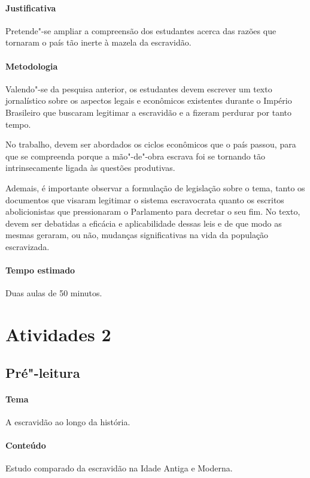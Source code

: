 \documentclass[12pt]{extarticle}
\begin{document}
\paragraph{Justificativa} Pretende"-se ampliar a compreensão dos estudantes acerca das razões que
tornaram o país tão inerte à mazela da escravidão.

\paragraph{Metodologia} Valendo"-se da pesquisa anterior, os estudantes
devem escrever um texto jornalístico sobre os aspectos legais e econômicos
existentes durante o Império Brasileiro que buscaram legitimar a escravidão
e a fizeram perdurar por tanto tempo.

No trabalho, devem ser abordados os ciclos econômicos que o país passou,
para que se compreenda porque a mão"-de"-obra escrava foi se tornando
tão intrinsecamente ligada às questões produtivas. 

Ademais, é importante observar a formulação de legislação sobre o tema, tanto
os documentos que visaram legitimar o sistema escravocrata quanto os escritos abolicionistas
que pressionaram o Parlamento para decretar o seu fim. No texto, devem ser debatidas
a eficácia e aplicabilidade dessas leis e de que modo as mesmas geraram, ou não,
mudanças significativas na vida da população escravizada.

\paragraph{Tempo estimado} Duas aulas de 50 minutos.

\section{Atividades 2}



\subsection{Pré"-leitura}


\paragraph{Tema} A escravidão ao longo da história.

\paragraph{Conteúdo} Estudo comparado da escravidão na Idade Antiga e Moderna.
\end{document}

